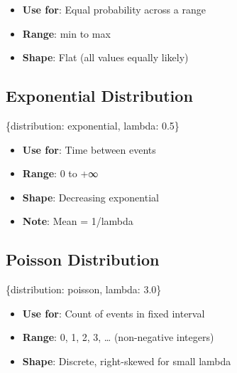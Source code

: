 \documentclass[
  letterpaper,
]{scrbook}
\newenvironment{Shaded}{\begin{snugshade}}{\end{snugshade}}
\newcommand{\FloatTok}[1]{\textcolor[rgb]{0.68,0.00,0.00}{#1}}
\newcommand{\NormalTok}[1]{\textcolor[rgb]{0.00,0.23,0.31}{#1}}
\newcommand{\StringTok}[1]{\textcolor[rgb]{0.13,0.47,0.30}{#1}}
\providecommand{\tightlist}{%
  \setlength{\itemsep}{0pt}\setlength{\parskip}{0pt}}
\begin{document}
\begin{itemize}
\tightlist
\item
  \textbf{Use for}: Equal probability across a range
\item
  \textbf{Range}: min to max
\item
  \textbf{Shape}: Flat (all values equally likely)
\end{itemize}

\subsection{Exponential Distribution}\label{exponential-distribution}

\begin{Shaded}
\begin{Highlighting}[]
\NormalTok{\{}\StringTok{\textquotesingle{}distribution\textquotesingle{}}\NormalTok{: }\StringTok{\textquotesingle{}exponential\textquotesingle{}}\NormalTok{, }\StringTok{\textquotesingle{}lambda\textquotesingle{}}\NormalTok{: }\FloatTok{0.5}\NormalTok{\}}
\end{Highlighting}
\end{Shaded}

\begin{itemize}
\tightlist
\item
  \textbf{Use for}: Time between events
\item
  \textbf{Range}: 0 to +∞
\item
  \textbf{Shape}: Decreasing exponential
\item
  \textbf{Note}: Mean = 1/lambda
\end{itemize}

\subsection{Poisson Distribution}\label{poisson-distribution}

\begin{Shaded}
\begin{Highlighting}[]
\NormalTok{\{}\StringTok{\textquotesingle{}distribution\textquotesingle{}}\NormalTok{: }\StringTok{\textquotesingle{}poisson\textquotesingle{}}\NormalTok{, }\StringTok{\textquotesingle{}lambda\textquotesingle{}}\NormalTok{: }\FloatTok{3.0}\NormalTok{\}}
\end{Highlighting}
\end{Shaded}

\begin{itemize}
\tightlist
\item
  \textbf{Use for}: Count of events in fixed interval
\item
  \textbf{Range}: 0, 1, 2, 3, \ldots{} (non-negative integers)
\item
  \textbf{Shape}: Discrete, right-skewed for small lambda
\end{itemize}
\end{document}
